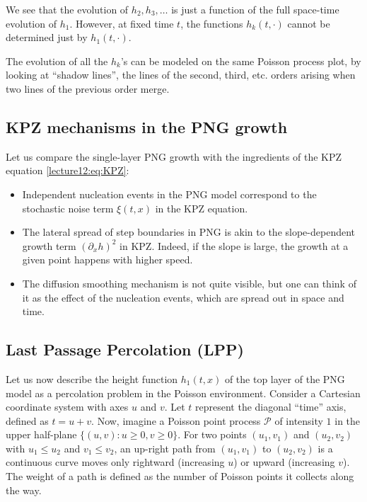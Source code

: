 \documentclass[letterpaper,11pt,oneside,reqno]{book}
\numberwithin{equation}{chapter}  %
\theoremstyle{definition}
\begin{document}
We see that the evolution of $h_2,h_3,\ldots $ is
just a function of the full space-time evolution of $h_1$.
However, at fixed time $t$,
the functions $h_k(t,\cdot)$ cannot be determined
just by $h_1(t,\cdot)$.

The evolution of all the $h_k$'s can be modeled on the same Poisson process plot,
by looking at ``shadow lines'', the lines of the second, third, etc. orders
arising when two lines of the previous order merge.

\subsection{KPZ mechanisms in the PNG growth}

Let us compare the single-layer PNG growth with the ingredients of the KPZ equation
\eqref{lecture12:eq:KPZ}:
\begin{itemize}
	\item Independent nucleation events in the PNG model correspond to the stochastic noise term $\xi(t,x)$ in the KPZ equation.
	\item The lateral spread of step boundaries in PNG is akin to the slope-dependent growth term $(\partial_x h)^2$ in KPZ. Indeed, if the slope is large, the growth at a given point happens with higher speed.
	\item
		The diffusion smoothing mechanism is not quite visible, but one can think of it as the effect of the nucleation events, which are spread out in space and time.
\end{itemize}

\subsection{Last Passage Percolation (LPP)}

Let us now describe the height function $h_1(t,x)$ of the top layer of the PNG model as a
percolation problem in the Poisson environment.
Consider a Cartesian coordinate system with axes $u$ and
$v$. Let $t$
represent the diagonal ``time'' axis, defined as $t = u + v$.
Now, imagine a Poisson point process $\mathcal{P}$ of
intensity $1$ in the upper half-plane $\{(u,v): u\ge 0, v\ge 0\}$.
For two points $(u_1, v_1)$ and $(u_2, v_2)$ with $u_1 \leq
u_2$ and $v_1 \leq v_2$, an up-right path from $(u_1, v_1)$
to $(u_2, v_2)$ is a continuous curve moves only
rightward (increasing $u$) or upward (increasing $v$). The
weight of a path is defined as the number of Poisson points
it collects along the way.
\end{document}
